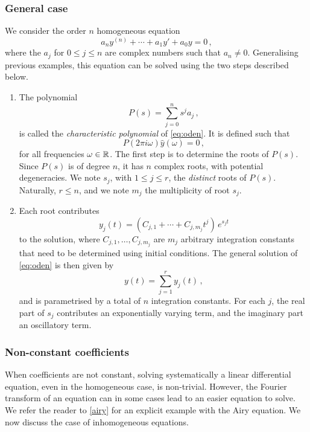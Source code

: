 \subsubsection{General case}
We consider the order $n$ homogeneous equation
\begin{equation}
  a_ny^{(n)}+\cdots+a_1y'+a_0y=0\,,\label{eq:oden}
\end{equation}
where the $a_j$ for $0\leq j\leq n$ are complex numbers such that $a_n\neq 0$.
Generalising previous examples, this equation can be solved using the two steps described
below.
\begin{enumerate}
  \item The polynomial
    \begin{equation}
      P(s)=\sum_{j=0}^{n} s^ja_j\,,
    \end{equation}
    is called the \emph{characteristic polynomial} of \cref{eq:oden}. It is defined such
    that
    \begin{equation}
      P(2\pi i\omega)\hat{y}(\omega)=0\,,
    \end{equation}
    for all frequencies $\omega\in\mathbb{R}$. The first step is to determine the roots of $P(s)$.
    Since $P(s)$ is of degree $n$, it has $n$ complex roots, with potential degeneracies.
    We note $s_j$, with $1\leq j\leq r$, the \emph{distinct} roots of $P(s)$. Naturally,
    $r\leq n$, and we note $m_j$ the multiplicity of root $s_j$.
  \item Each root contributes
    \begin{equation}
      y_j(t)=(C_{j,1}+\cdots+C_{j,m_j}t^j)\,e^{s_jt}
    \end{equation}
    to the solution, where $C_{j,1},\dots,C_{j,m_j}$ are $m_j$ arbitrary integration
    constants that need to be determined using initial conditions. The general solution of
    \cref{eq:oden} is then given by
    \begin{equation}
      y(t)=\sum_{j=1}^{r}y_j(t)\,,
    \end{equation}
    and is parametrised by a total of $n$ integration constants. For each $j$, the real
    part of $s_j$ contributes an exponentially varying term, and the imaginary part an
    oscillatory term.
\end{enumerate}
\subsubsection{Non-constant coefficients}
When coefficients are not constant, solving systematically a linear differential equation,
even in the homogeneous case, is non-trivial. However, the Fourier transform of an
equation can in some cases lead to an easier equation to solve. We refer the reader to
\cref{airy} for an explicit example with the Airy equation. We now discuss the case of
inhomogeneous equations.
